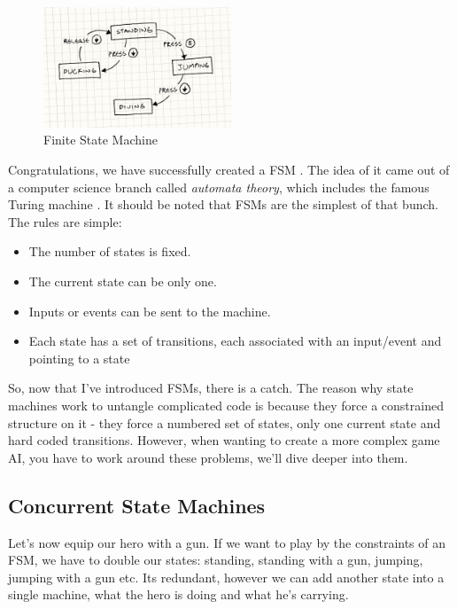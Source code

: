 \documentclass[a4paper, 12pt]{book}
\begin{document}
\begin{figure}[h]
\begin{center}
\includegraphics[width=0.5\textwidth]{Images/state_FSM.png}
\end{center}
\caption{Finite State Machine}
\label{pic1}
\end{figure}

Congratulations, we have successfully created a FSM \cite{GameProgrammingPattersFMS}. The idea of it came out of a computer science branch called \emph{automata theory}, which includes the famous Turing machine \cite{TuringMachine}. It should be noted that FSMs are the simplest of that bunch. The rules are simple:
\begin{itemize}
    \item The number of states is fixed.
    \item The current state can be only one.
    \item Inputs or events can be sent to the machine.
    \item Each state has a set of transitions, each associated with an input/event and pointing to a state
\end{itemize}

So, now that I've introduced FSMs, there is a catch. 
The reason why state machines work to untangle complicated code is because they force a constrained structure on it - they force a numbered set of states, only one current state and hard coded transitions. However, when wanting to create a more complex game AI, you have to work around these problems, we'll dive deeper into them. 

\subsection{Concurrent State Machines}

Let's now equip our hero with a gun. If we want to play by the constraints of an FSM, we have to double our states: standing, standing with a gun, jumping, jumping with a gun etc. Its redundant, however we can add another state into a single machine, what the hero is doing and what he's carrying.
\end{document}
